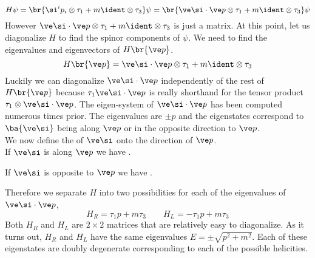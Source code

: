 \documentclass{article}
\begin{document}
\[ H\psi = \br{\si^{i} p_i \otimes \tau_{1} + m \ident \otimes\tau_{3}}\psi = \br{\ve \si \cdot \ve p \otimes \tau_1  + m \ident \otimes \tau_3} \psi \]
However $\ve \si \cdot \ve p \otimes \tau_1 + m \ident \otimes \tau_3$ is just a matrix. At this point, let us diagonalize $H$ to find the spinor components of $\psi$. We need to find the eigenvalues and eigenvectors of $H\br{\ve p}$.
\[ H\br{\ve p} = \ve \si \cdot \ve p \otimes \tau_{1} + m \ident \otimes \tau_3 \]
Luckily we can diagonalize $\ve \si \cdot \ve p$ independently of the rest of $H\br{\ve p}$ because $\tau_1 \ve \si \cdot \ve p$ is really shorthand for the tensor product $\tau_1 \otimes \ve \si \cdot \ve p$. The eigen-system of $\ve \si \cdot \ve p$ has been computed numerous times prior. The eigenvalues are $\pm p$ and the eigenstates correspond to $\ba{\ve \si}$ being along $\ve p$ or in the opposite direction to $\ve p$. \\

We now define the  of $\ve \si$ onto the direction of $\ve p$.\\

If $\ve \si$ is along $\ve p$ we have .
\begin{center}
\end{center}

If $\ve \si$ is opposite to $\ve p$ we have .
\begin{center}
\end{center}
Therefore we separate $H$ into two possibilities for each of the eigenvalues of $\ve \si \cdot \ve p$,
\[ H_{R} = \tau_1 p + m \tau_3 \qquad H_{L} = -\tau_1 p + m \tau_3 \]
Both $H_{R}$ and $H_{L}$ are $2 \times 2$ matrices that are relatively easy to diagonalize. As it turns out, $H_{R}$ and $H_{L}$ have the same eigenvalues $E = \pm \sqrt{p^2 + m^2}$. Each of these eigenstates are doubly degenerate corresponding to each of the possible helicities.

\begin{center}
\end{center}
\end{document}
